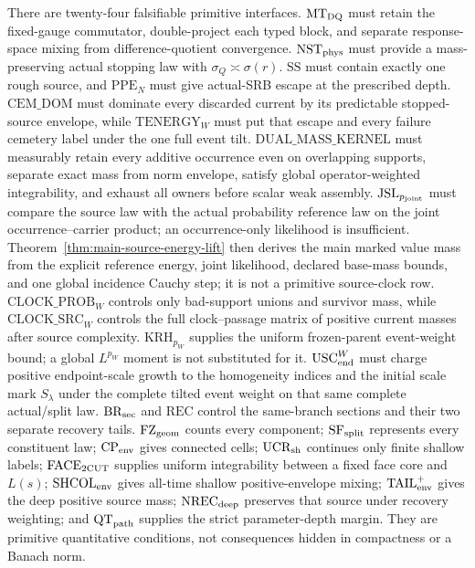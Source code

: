 \documentclass[11pt]{article}
\begin{document}
There are twenty-four falsifiable primitive interfaces.  $\mathrm{MT}_{\rm DQ}$ must
retain the fixed-gauge commutator, double-project each typed block, and
separate response-space mixing from difference-quotient convergence.
$\mathrm{NST}_{\rm phys}$ must provide a
mass-preserving actual stopping law with
$\sigma_Q\asymp\sigma(r)$.  $\mathrm{SS}$ must contain exactly one rough source, and
$\mathrm{PPE}_{N}$ must give actual-SRB escape at the prescribed depth.
$\mathrm{CEM\_DOM}$ must dominate every discarded current by its predictable
stopped-source envelope, while $\mathrm{TENERGY}_{W}$ must put that escape
and every failure cemetery label under the one full event tilt.
$\mathrm{DUAL\_MASS\_KERNEL}$ must measurably retain every additive
occurrence even on overlapping supports, separate exact mass from norm
envelope, satisfy global operator-weighted integrability, and exhaust all
owners before scalar weak assembly.  $\mathrm{JSL}_{p_{\rm joint}}$ must
compare the source law with the actual probability reference law on the
joint occurrence--carrier product; an occurrence-only likelihood is
insufficient.  Theorem~\ref{thm:main-source-energy-lift} then derives the main
marked value mass from the explicit reference energy, joint likelihood,
declared base-mass bounds, and one global incidence Cauchy step; it is not a
primitive source-clock row.  $\mathrm{CLOCK\_PROB}_{W}$
controls only bad-support
unions and survivor mass, while $\mathrm{CLOCK\_SRC}_{W}$ controls the full
clock--passage matrix of positive current masses after source complexity.
$\mathrm{KRH}_{p_W}$ supplies the uniform frozen-parent event-weight bound;
a global $L^{p_W}$ moment is not substituted for it.
$\mathrm{USC}_{\rm end}^{W}$ must charge positive endpoint-scale growth to the
homogeneity indices and the initial scale mark $S_\lambda$ under the complete
tilted event weight on that same complete actual/split law.
$\mathrm{BR}_{\rm sec}$ and $\mathrm{REC}$ control the same-branch
sections and their two separate recovery tails.
$\mathrm{FZ}_{\rm geom}$ counts every component;
$\mathrm{SF}_{\rm split}$ represents every constituent law;
$\mathrm{CP}_{\rm env}$ gives connected cells;
$\mathrm{UCR}_{\rm sh}$ continues only finite shallow labels;
$\mathrm{FACE}_{\rm 2CUT}$ supplies uniform integrability between a fixed
face core and $L(s)$;
$\mathrm{SHCOL}_{\rm env}$ gives all-time shallow positive-envelope
mixing; $\mathrm{TAIL}_{\rm env}^{+}$ gives the deep positive source mass;
$\mathrm{NREC}_{\rm deep}$ preserves that source under recovery weighting;
and $\mathrm{QT}_{\rm path}$ supplies the strict parameter-depth margin.
They are primitive quantitative conditions, not consequences hidden in
compactness or a Banach norm.
\end{document}
